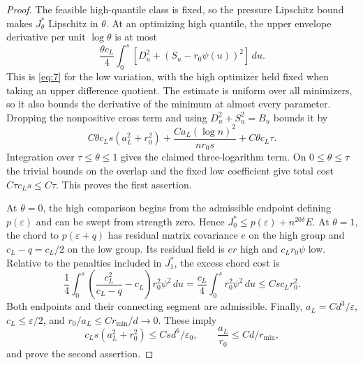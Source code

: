 \begin{proof}
The feasible high-quantile class is fixed, so the pressure Lipschitz
bound makes $J_\theta^*$ Lipschitz in $\theta$.
At an optimizing high quantile, the upper envelope derivative per
unit $\log\theta$ is at most
\[
 \frac{\theta c_L}{4}\int_0^s
       [D_u^2+(S_u-r_0\psi(u))^2]\,du.
\]
This is \eqref{eq:7} for the low variation, with the high optimizer
held fixed when taking an upper difference quotient.  The estimate
is uniform over all minimizers, so it also bounds the derivative of
the minimum at almost every parameter.  Dropping the nonpositive
cross term and using $D_u^2+S_u^2=B_u$ bounds it by
\[
 C\theta c_Ls(a_L^2+r_0^2)
       +\frac{C a_L(\log n)^2}{nr_0s}+C\theta c_L\tau.
\]
Integration over $\tau\le\theta\le1$ gives the claimed three-logarithm
term.  On $0\le\theta\le\tau$ the trivial bounds on the overlap and
the fixed low coefficient give total cost $C\tau c_Ls\le C\tau$.
This proves the first assertion.

At $\theta=0$, the high comparison begins from the admissible endpoint
defining $p(\varepsilon)$ and can be swept from strength zero.  Hence
$J_0^*\le p(\varepsilon)+n^{20\delta}E$.
At $\theta=1$, the chord to $p(\varepsilon+q)$ has residual matrix
covariance $e$ on the high group and $c_L-q=c_L/2$ on the low group.
Its residual field is $er$ high and $c_Lr_0\psi$ low.  Relative to
the penalties included in $J_1^*$, the excess chord cost is
\[
 \frac14\int_0^s
  \left(\frac{c_L^2}{c_L-q}-c_L\right)r_0^2\psi^2\,du
       =\frac{c_L}{4}\int_0^s r_0^2\psi^2\,du
       \le Csc_Lr_0^2.
\]
Both endpoints and their connecting segment are admissible.  Finally,
$a_L=Cd^3/\varepsilon$, $c_L\le\varepsilon/2$, and
$r_0/a_L\le C r_{\min}/d\to0$.  These imply
\[
 c_Ls(a_L^2+r_0^2)\le Csd^6/\varepsilon_0,
 \qquad \frac{a_L}{r_0}\le C d/r_{\min},
\]
and prove the second assertion.
\end{proof}

